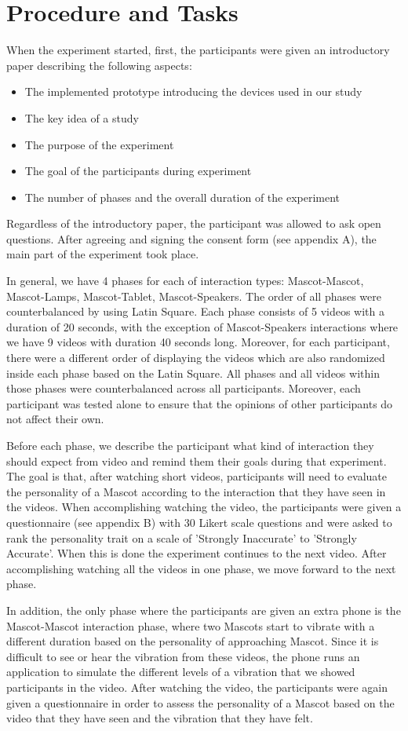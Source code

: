 \section{Procedure and Tasks}
\label{sec:procedure-and-tasks}
When the experiment started, first, the participants were given an introductory paper describing the following aspects:
\begin{itemize}
  \item The implemented prototype introducing the devices used in our study
  \item The key idea of a study
  \item The purpose of the experiment
  \item The goal of the participants during experiment
  \item The number of phases and the overall duration of the experiment
\end{itemize}

Regardless of the introductory paper, the participant was allowed to ask open questions.
After agreeing and signing the consent form (see appendix A), the main part of the experiment took place.
\par In general, we have 4 phases for each of interaction types: Mascot-Mascot,
Mascot-Lamps, Mascot-Tablet, Mascot-Speakers.
The order of all phases were counterbalanced by using Latin Square.
Each phase consists of 5 videos with a duration of 20 seconds, with the exception of
Mascot-Speakers interactions where we have 9 videos with duration 40 seconds long.
Moreover, for each participant, there were a different order of displaying the videos
which are also randomized inside each phase based on the Latin Square.
All phases and all videos within those phases were counterbalanced across all participants.
Moreover, each participant was tested alone to ensure that the opinions of other participants do not affect their own.
\par Before each phase, we describe the participant what kind of interaction they should
expect from video and remind them their goals during that experiment.
The goal is that, after watching short videos, participants will need to evaluate the personality
of a Mascot according to the interaction that they have seen in the videos.
When accomplishing watching the video, the participants were given a questionnaire
(see appendix B) with 30 Likert scale questions and were asked to rank the personality trait
on a scale of 'Strongly Inaccurate' to 'Strongly Accurate'.
When this is done the experiment continues to the next video.
After accomplishing watching all the videos in one phase, we move forward to the next phase.
\par In addition, the only phase where the participants are given an extra phone
is the Mascot-Mascot interaction phase, where two Mascots start to vibrate
with a different duration based on the personality of approaching Mascot.
Since it is difficult to see or hear the vibration from these videos, the phone runs an
application to simulate the different levels of a vibration that we showed participants in the video.
After watching the video, the participants were again given a questionnaire in order to assess
the personality of a Mascot based on the video that they have seen and the vibration that they have felt.

